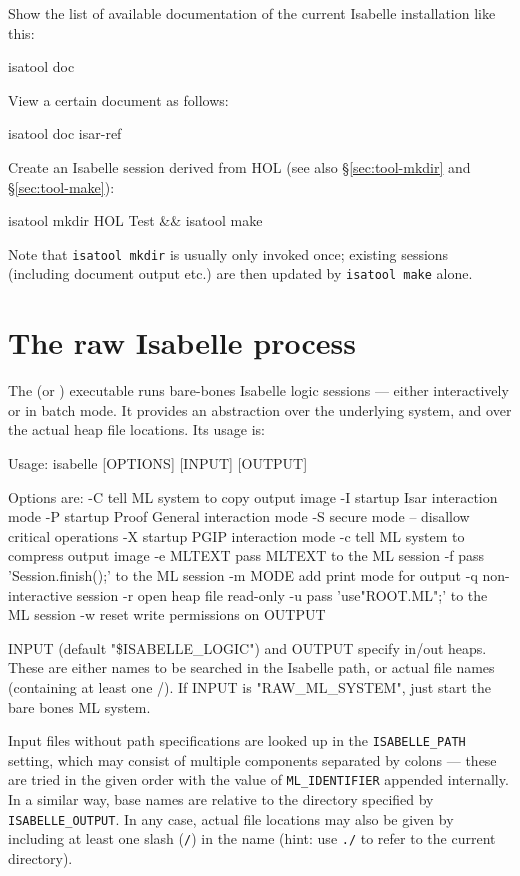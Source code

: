 Show the list of available documentation of the current Isabelle installation
like this:
\begin{ttbox}
  isatool doc
\end{ttbox}

View a certain document as follows:
\begin{ttbox}
  isatool doc isar-ref
\end{ttbox}

Create an Isabelle session derived from HOL (see also \S\ref{sec:tool-mkdir}
and \S\ref{sec:tool-make}):
\begin{ttbox}
  isatool mkdir HOL Test && isatool make
\end{ttbox}
Note that \texttt{isatool mkdir} is usually only invoked once; existing
sessions (including document output etc.) are then updated by \texttt{isatool
  make} alone.


\section{The raw Isabelle process}

The  (or ) executable runs
bare-bones Isabelle logic sessions --- either interactively or in batch mode.
It provides an abstraction over the underlying {\ML} system, and over the
actual heap file locations.  Its usage is:
\begin{ttbox}
Usage: isabelle [OPTIONS] [INPUT] [OUTPUT]

  Options are:
    -C           tell ML system to copy output image
    -I           startup Isar interaction mode
    -P           startup Proof General interaction mode
    -S           secure mode -- disallow critical operations
    -X           startup PGIP interaction mode
    -c           tell ML system to compress output image
    -e MLTEXT    pass MLTEXT to the ML session
    -f           pass 'Session.finish();' to the ML session
    -m MODE      add print mode for output
    -q           non-interactive session
    -r           open heap file read-only
    -u           pass 'use"ROOT.ML";' to the ML session
    -w           reset write permissions on OUTPUT

  INPUT (default "\$ISABELLE_LOGIC") and OUTPUT specify in/out heaps.
  These are either names to be searched in the Isabelle path, or
  actual file names (containing at least one /).
  If INPUT is "RAW_ML_SYSTEM", just start the bare bones ML system.
\end{ttbox}
Input files without path specifications are looked up in the
\texttt{ISABELLE_PATH} setting, which may consist of multiple components
separated by colons --- these are tried in the given order with the value of
\texttt{ML_IDENTIFIER} appended internally.  In a similar way, base names are
relative to the directory specified by \texttt{ISABELLE_OUTPUT}.  In any case,
actual file locations may also be given by including at least one slash
(\texttt{/}) in the name (hint: use \texttt{./} to refer to the current
directory).


